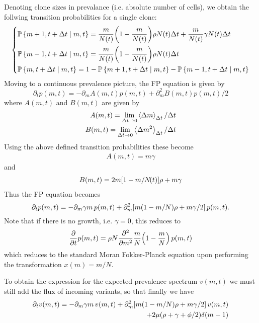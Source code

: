 \documentclass[pdftex,12pt,a4paper]{scrartcl}
\renewcommand{\P}[2]{\mathbb{P} \left\lbrace #1 \mid #2 \right\rbrace}
\begin{document}
Denoting clone sizes in prevalance (i.e. absolute number of cells), we obtain the follwing transition probabilities for a single clone:
\begin{equation}
\left\lbrace
    \begin{aligned}
        &\P{m+1, t+\Delta t}{m, t} = \frac{m}{N(t)}\qty(1 - \frac{m}{N(t)})\rho N(t)\Delta t + \frac{m}{N(t)}\gamma N(t)\Delta t\\
        &\P{m-1, t+\Delta t}{m, t} = \frac{m}{N(t)}\qty(1 - \frac{m}{N(t)})\rho N(t)\Delta t \\
        &\P{m, t+\Delta t}{m, t} = 1 - \P{m+1, t+\Delta t}{m, t} - \P{m-1, t+\Delta t}{m, t}
    \end{aligned}
\right.
\end{equation}
Moving to a continuous prevalence picture, the FP equation is given by
\begin{equation}
    \partial_t p(m,t) = -\partial_m A(m,t) p(m,t) + \partial_m^2 B(m,t)p(m,t)/2
\end{equation} 
where $A(m,t)$ and $B(m,t)$ are given by
\begin{align}
    A(m,t) = \lim_{\Delta t \rightarrow 0} \ev{\Delta m}_{\Delta t} / \Delta t \\
    B(m,t) = \lim_{\Delta t \rightarrow 0} \ev{\Delta m^2}_{\Delta t} / \Delta t
\end{align}
Using the above defined transition probabilities these become
\begin{align}
    A(m,t) = m \gamma
\end{align}
and
\begin{align}
    B(m,t) = 2 m \qty[1 - m/N \! (t) ]\rho + m \gamma
\end{align}
Thus the FP equation becomes
\begin{equation}\label{eq:FPSingleGrowth}
    \partial_t p(m,t) = -\partial_m \gamma m \, p(m,t) + \partial_m^2 \qty[m(1-m/N)\rho + m \gamma/2] \, p(m,t).
\end{equation}
Note that if there is no growth, i.e. $\gamma = 0$, this reduces to
\begin{equation}\label{eq:FPMoran}
    \pdv{t} p(m,t) = \rho N \pdv[2]{m} \frac{m}{N}\qty(1-\frac{m}{N}) \, p(m,t)
\end{equation}
which reduces to the standard Moran Fokker-Planck equation upon performing the transformation $x(m) = m/N$.

To obtain the expression for the expected prevalence spectrum $v(m,t)$ we must still add the flux of incoming variants, so that finally we have
\begin{equation}\label{eq:FPVafGrowth}
    \begin{aligned}
        \partial_t v(m,t) = -\partial_m \gamma m \, v(m,t) + \partial_m^2 \qty[m(1-m/N)\rho + m \gamma/2] \, v(m,t) &\\
        + 2\mu( \rho + \gamma + \phi/2 )\delta( m-1 ) &
    \end{aligned}
\end{equation}
\end{document}
